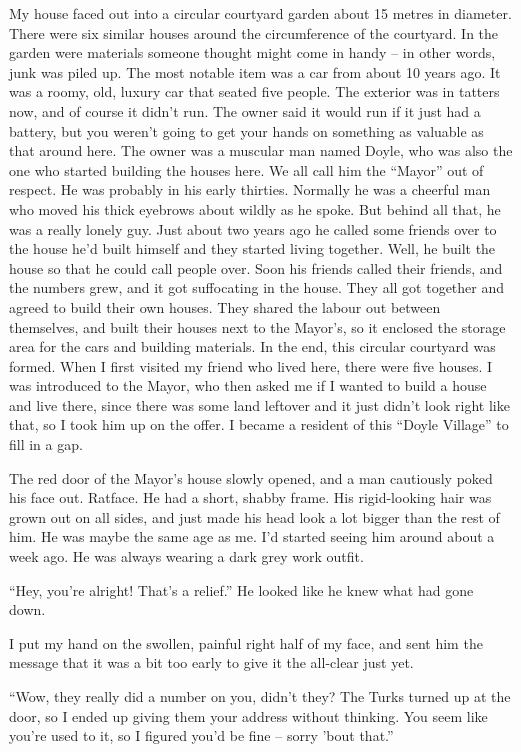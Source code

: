 \documentclass[oneside]{book}
\begin{document}
My house faced out into a circular courtyard garden about 15 metres in diameter. There were six similar houses around the circumference of the courtyard. In the garden were materials someone thought might come in handy – in other words, junk was piled up. The most notable item was a car from about 10 years ago. It was a roomy, old, luxury car that seated five people. The exterior was in tatters now, and of course it didn’t run. The owner said it would run if it just had a battery, but you weren’t going to get your hands on something as valuable as that around here. The owner was a muscular man named Doyle, who was also the one who started building the houses here. We all call him the “Mayor” out of respect. He was probably in his early thirties. Normally he was a cheerful man who moved his thick eyebrows about wildly as he spoke. But behind all that, he was a really lonely guy. Just about two years ago he called some friends over to the house he’d built himself and they started living together. Well, he built the house so that he could call people over. Soon his friends called their friends, and the numbers grew, and it got suffocating in the house. They all got together and agreed to build their own houses. They shared the labour out between themselves, and built their houses next to the Mayor’s, so it enclosed the storage area for the cars and building materials. In the end, this circular courtyard was formed. When I first visited my friend who lived here, there were five houses. I was introduced to the Mayor, who then asked me if I wanted to build a house and live there, since there was some land leftover and it just didn’t look right like that, so I took him up on the offer. I became a resident of this “Doyle Village” to fill in a gap.

The red door of the Mayor’s house slowly opened, and a man cautiously poked his face out. Ratface. He had a short, shabby frame. His rigid-looking hair was grown out on all sides, and just made his head look a lot bigger than the rest of him. He was maybe the same age as me. I’d started seeing him around about a week ago. He was always wearing a dark grey work outfit.

“Hey, you’re alright! That’s a relief.” He looked like he knew what had gone down.

I put my hand on the swollen, painful right half of my face, and sent him the message that it was a bit too early to give it the all-clear just yet.

“Wow, they really did a number on you, didn’t they? The Turks turned up at the door, so I ended up giving them your address without thinking. You seem like you’re used to it, so I figured you’d be fine – sorry ’bout that.”
\end{document}
